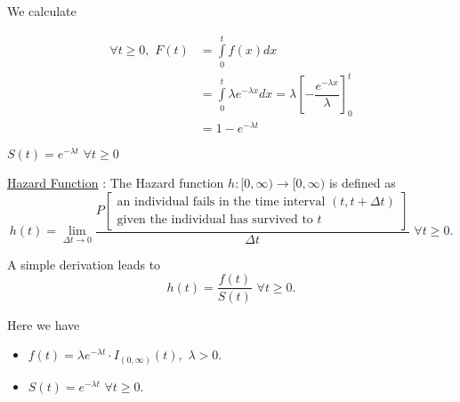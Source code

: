 \documentclass[12pt, a4paper, onecolumn, answers]{exam}
\begin{document}
\begin{questions}
\begin{solution}
We calculate

\begin{align*}
\forall t \geq 0, \,\, F(t) &= \int \limits_{0}^{t} f(x) dx \\
&= \int \limits_{0}^{t} \lambda e^{-\lambda x} dx = \lambda \left[-\dfrac{e^{-\lambda x}}{\lambda}\right]_{0}^{t} \\
&= 1 - e^{-\lambda t}
\end{align*}

\therefore \hspace{0.1cm} $S(t) = e^{-\lambda t} \,\, \forall t \geq 0$

\begin{center}
\end{center}

\leftpointright \hspace{0.1cm} \underline{Hazard Function} : The Hazard function $h : [0, \infty) \rightarrow [0, \infty)$ is defined as
\[
h(t) = \lim \limits_{\Delta t \to 0} \dfrac{
   P\left[
    \begin{array}{c}
      \text{an individual fails in the time interval } (t, t + \Delta t) \\
      \text{given the individual has survived to } t
    \end{array}
  \right]
}{
  \Delta t
}
\,\, \forall t \geq 0.
\]

A simple derivation leads to $$h(t) = \dfrac{f(t)}{S(t)} \,\, \forall t \geq 0.$$

Here we have
\begin{itemize}
\item $f(t) = \lambda e^{-\lambda t} \cdot I_{(0, \infty)}(t), \,\, \lambda > 0$.
\item $S(t) = e^{-\lambda t} \,\, \forall t \geq 0$.
\end{itemize}


\end{solution}
\end{questions}
\end{document}
